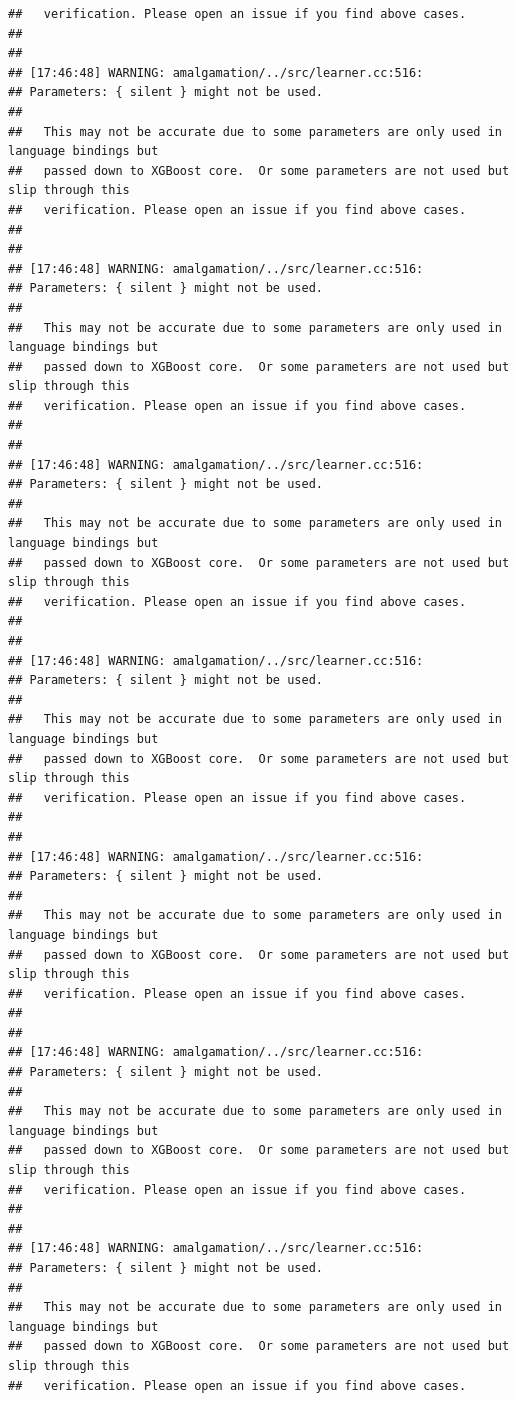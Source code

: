 \documentclass[AMS,STIX2COL]{WileyNJD-v2}\usepackage[]{graphicx}\usepackage[]{color}
\makeatletter
\newenvironment{kframe}{%
 \def\at@end@of@kframe{}%
 \ifinner\ifhmode%
  \def\at@end@of@kframe{\end{minipage}}%
  \begin{minipage}{\columnwidth}%
 \fi\fi%
 \def\FrameCommand##1{\hskip\@totalleftmargin \hskip-\fboxsep
 \colorbox{shadecolor}{##1}\hskip-\fboxsep
     \hskip-\linewidth \hskip-\@totalleftmargin \hskip\columnwidth}%
 \MakeFramed {\advance\hsize-\width
   \@totalleftmargin\z@ \linewidth\hsize
   \@setminipage}}%
 {\par\unskip\endMakeFramed%
 \at@end@of@kframe}
\newenvironment{knitrout}{}{} %
\makeatother
\begin{document}
\begin{knitrout}
\begin{kframe}
\begin{verbatim}
##   verification. Please open an issue if you find above cases.
## 
## 
## [17:46:48] WARNING: amalgamation/../src/learner.cc:516: 
## Parameters: { silent } might not be used.
## 
##   This may not be accurate due to some parameters are only used in language bindings but
##   passed down to XGBoost core.  Or some parameters are not used but slip through this
##   verification. Please open an issue if you find above cases.
## 
## 
## [17:46:48] WARNING: amalgamation/../src/learner.cc:516: 
## Parameters: { silent } might not be used.
## 
##   This may not be accurate due to some parameters are only used in language bindings but
##   passed down to XGBoost core.  Or some parameters are not used but slip through this
##   verification. Please open an issue if you find above cases.
## 
## 
## [17:46:48] WARNING: amalgamation/../src/learner.cc:516: 
## Parameters: { silent } might not be used.
## 
##   This may not be accurate due to some parameters are only used in language bindings but
##   passed down to XGBoost core.  Or some parameters are not used but slip through this
##   verification. Please open an issue if you find above cases.
## 
## 
## [17:46:48] WARNING: amalgamation/../src/learner.cc:516: 
## Parameters: { silent } might not be used.
## 
##   This may not be accurate due to some parameters are only used in language bindings but
##   passed down to XGBoost core.  Or some parameters are not used but slip through this
##   verification. Please open an issue if you find above cases.
## 
## 
## [17:46:48] WARNING: amalgamation/../src/learner.cc:516: 
## Parameters: { silent } might not be used.
## 
##   This may not be accurate due to some parameters are only used in language bindings but
##   passed down to XGBoost core.  Or some parameters are not used but slip through this
##   verification. Please open an issue if you find above cases.
## 
## 
## [17:46:48] WARNING: amalgamation/../src/learner.cc:516: 
## Parameters: { silent } might not be used.
## 
##   This may not be accurate due to some parameters are only used in language bindings but
##   passed down to XGBoost core.  Or some parameters are not used but slip through this
##   verification. Please open an issue if you find above cases.
## 
## 
## [17:46:48] WARNING: amalgamation/../src/learner.cc:516: 
## Parameters: { silent } might not be used.
## 
##   This may not be accurate due to some parameters are only used in language bindings but
##   passed down to XGBoost core.  Or some parameters are not used but slip through this
##   verification. Please open an issue if you find above cases.

\end{verbatim}
\end{kframe}
\end{knitrout}
\end{document}
